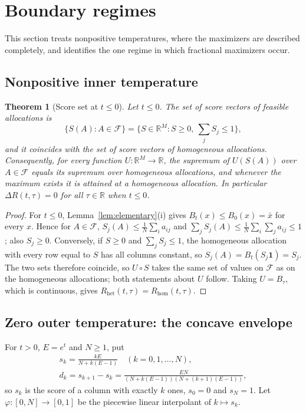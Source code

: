 \documentclass[11pt]{article}
\theoremstyle{plain}
\newtheorem{theorem}{Theorem}[section]
\theoremstyle{definition}
\theoremstyle{remark}
\newcommand{\Rhet}{R_{\mathrm{het}}}
\newcommand{\Rhom}{R_{\mathrm{hom}}}
\newcommand{\Feas}{\mathcal{F}}
\begin{document}
\section{Boundary regimes}\label{sec:boundary}

This section treats nonpositive temperatures, where the maximizers are described completely, and identifies the one regime in which fractional maximizers occur.

\subsection{Nonpositive inner temperature}\label{sec:scoreset}

\begin{theorem}[Score set at $t\le0$]\label{thm:scoreset}
Let $t\le0$. The set of score vectors of feasible allocations is
\[
 \{S(A):A\in\Feas\}=\{S\in\mathbb R^M:S\ge0,\ \textstyle\sum_jS_j\le1\},
\]
and it coincides with the set of score vectors of homogeneous allocations. Consequently, for every function $U:\mathbb R^M\to\mathbb R$, the supremum of $U(S(A))$ over $A\in\Feas$ equals its supremum over homogeneous allocations, and whenever the maximum exists it is attained at a homogeneous allocation. In particular $\Delta R(t,\tau)=0$ for all $\tau\in\mathbb R$ when $t\le0$.
\end{theorem}

\begin{proof}
For $t\le0$, Lemma~\ref{lem:elementary}(i) gives $B_t(x)\le B_0(x)=\bar x$ for every $x$. Hence for $A\in\Feas$, $S_j(A)\le\frac1N\sum_ia_{ij}$ and $\sum_jS_j(A)\le\frac1N\sum_i\sum_ja_{ij}\le1$; also $S_j\ge0$. Conversely, if $S\ge0$ and $\sum_jS_j\le1$, the homogeneous allocation with every row equal to $S$ has all columns constant, so $S_j(A)=B_t(S_j\mathbf 1)=S_j$. The two sets therefore coincide, so $U\circ S$ takes the same set of values on $\Feas$ as on the homogeneous allocations; both statements about $U$ follow. Taking $U=B_\tau$, which is continuous, gives $\Rhet(t,\tau)=\Rhom(t,\tau)$.
\end{proof}

\subsection{Zero outer temperature: the concave envelope}\label{sec:envelope}

For $t>0$, $E=e^t$ and $N\ge1$, put
\begin{equation}\label{eq:sk}
 \begin{gathered}
 s_k=\frac{kE}{N+k(E-1)}\quad(k=0,1,\dots,N),\\
 d_k=s_{k+1}-s_k=\frac{EN}{(N+k(E-1))(N+(k+1)(E-1))},
 \end{gathered}
\end{equation}
so $s_k$ is the score of a column with exactly $k$ ones, $s_0=0$ and $s_N=1$. Let $\varphi:[0,N]\to[0,1]$ be the piecewise linear interpolant of $k\mapsto s_k$.
\end{document}
